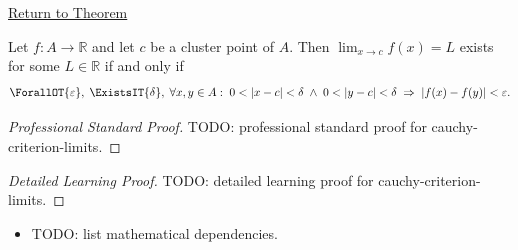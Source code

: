 \newpage
{}
\label{prf:cauchy-criterion-limits}

\begin{remark*}[Return]
\hyperref[prop:cauchy-criterion-limits]{Return to Theorem}
\end{remark*}

\begin{theorem*}
Let $f : A \to \mathbb{R}$ and let $c$ be a cluster point of $A$.
Then $\lim_{x\to c}f(x)=L$ exists for some
$L \in \mathbb{R}$ if and only if
\[
  \ForallOT{\varepsilon},\;
  \ExistsIT{\delta},\;
  \forall x, y \in A :\;
  0<|x-c|<\delta
  \;\wedge\;
  0<|y-c|<\delta
  \;\Rightarrow\;
  |f(x)-f(y)|<\varepsilon.
\]

\smallskip\noindent
\end{theorem*}

\begin{proof}[Professional Standard Proof]
\LRAProofBodyStart
TODO: professional standard proof for cauchy-criterion-limits.
\end{proof}

\begin{proof}[Detailed Learning Proof]
\LRAProofBodyStart
TODO: detailed learning proof for cauchy-criterion-limits.
\end{proof}

\begin{remark*}
\end{remark*}

\begin{dependencies}
\begin{itemize}
  \item TODO: list mathematical dependencies.
\end{itemize}
\end{dependencies}

\clearpage

